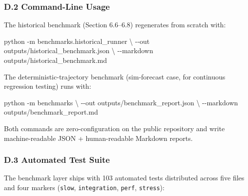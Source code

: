 \documentclass[
]{article}
\newenvironment{Shaded}{}{}
\newcommand{\AttributeTok}[1]{\textcolor[rgb]{0.49,0.56,0.16}{#1}}
\newcommand{\DataTypeTok}[1]{\textcolor[rgb]{0.56,0.13,0.00}{#1}}
\newcommand{\ExtensionTok}[1]{#1}
\newcommand{\NormalTok}[1]{#1}
\begin{document}
\subsubsection{D.2 Command-Line Usage}\label{d.2-command-line-usage}

The historical benchmark (Section 6.6--6.8) regenerates from scratch
with:

\begin{Shaded}
\begin{Highlighting}[]
\ExtensionTok{python} \AttributeTok{{-}m}\NormalTok{ benchmarks.historical\_runner }\DataTypeTok{\textbackslash{}}
    \AttributeTok{{-}{-}out}\NormalTok{ outputs/historical\_benchmark.json }\DataTypeTok{\textbackslash{}}
    \AttributeTok{{-}{-}markdown}\NormalTok{ outputs/historical\_benchmark.md}
\end{Highlighting}
\end{Shaded}

The deterministic-trajectory benchmark (sim-forecast case, for
continuous regression testing) runs with:

\begin{Shaded}
\begin{Highlighting}[]
\ExtensionTok{python} \AttributeTok{{-}m}\NormalTok{ benchmarks }\DataTypeTok{\textbackslash{}}
    \AttributeTok{{-}{-}out}\NormalTok{ outputs/benchmark\_report.json }\DataTypeTok{\textbackslash{}}
    \AttributeTok{{-}{-}markdown}\NormalTok{ outputs/benchmark\_report.md}
\end{Highlighting}
\end{Shaded}

Both commands are zero-configuration on the public repository and write
machine-readable JSON + human-readable Markdown reports.

\subsubsection{D.3 Automated Test Suite}\label{d.3-automated-test-suite}

The benchmark layer ships with 103 automated tests distributed across
five files and four markers (\texttt{slow}, \texttt{integration},
\texttt{perf}, \texttt{stress}):
\end{document}

